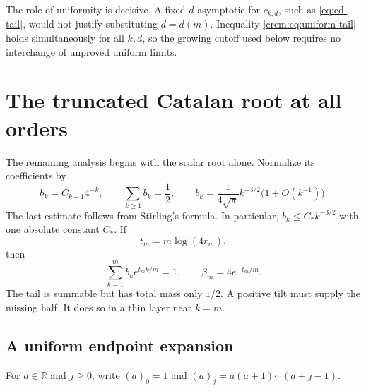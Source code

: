 \documentclass[11pt,a4paper]{article}
\theoremstyle{definition}\newaliascnt{definition}{theorem}
\theoremstyle{remark}\newaliascnt{remark}{theorem}
\newcommand{\R}{\mathbb R}
\begin{document}
The role of uniformity is decisive. A fixed-$d$ asymptotic for $c_{k,d}$,
such as \eqref{eq:cd-tail}, would not justify substituting $d=d(m)$.
Inequality \eqref{crem:eq:uniform-tail} holds simultaneously for all $k,d$, so
the growing cutoff used below requires no interchange of unproved uniform
limits.

\section{The truncated Catalan root at all orders}
\label{crem:sec:scalar}
The remaining analysis begins with the scalar root alone. Normalize its
coefficients by
\begin{equation}
 b_k=C_{k-1}4^{-k},\qquad
 \sum_{k\ge1}b_k=\frac12,\qquad
 b_k=\frac1{4\sqrt\pi}k^{-3/2}\bigl(1+O(k^{-1})\bigr).
 \label{crem:eq:bk}
\end{equation}
The last estimate follows from Stirling's formula. In particular,
$b_k\le C_\ast k^{-3/2}$ with one absolute constant $C_\ast$. If
\begin{equation}
 t_m=m\log(4r_m),
 \label{crem:eq:tm}
\end{equation}
then
\begin{equation}
 \sum_{k=1}^m b_ke^{t_mk/m}=1,
 \qquad \beta_m=4e^{-t_m/m}.
 \label{crem:eq:tilted-root}
\end{equation}
The tail is summable but has total mass only $1/2$. A positive tilt must
supply the missing half. It does so in a thin layer near $k=m$.

\subsection{A uniform endpoint expansion}
For $a\in\R$ and $j\ge0$, write $(a)_0=1$ and $(a)_j=a(a+1)\cdots(a+j-1)$.
\end{document}
